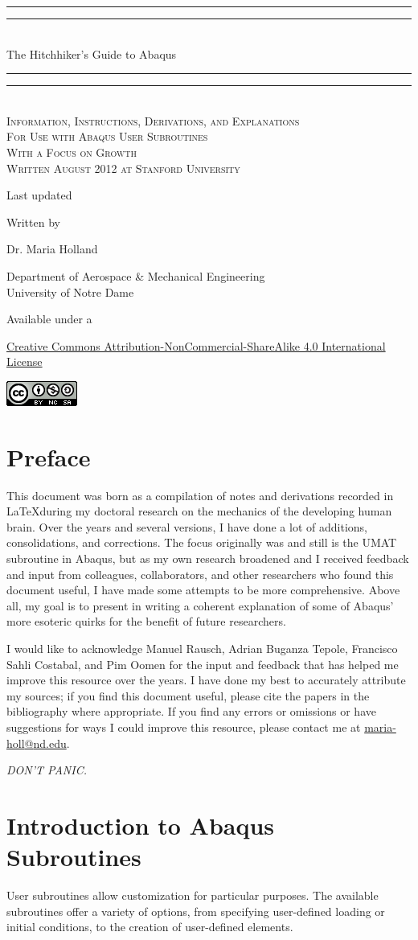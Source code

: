 \documentclass[10pt,letterpaper,oneside]{report}
\newcommand*{\titleGP}{\begingroup 
\thispagestyle{empty}
\centering

\vspace*{8\baselineskip} %
\rule{\textwidth}{1.6pt}\vspace*{-\baselineskip}\vspace*{2pt} 
\rule{\textwidth}{0.4pt}\\[\baselineskip] 
{\LARGE The Hitchhiker's Guide to Abaqus}\\[0.2\baselineskip] 
\rule{\textwidth}{0.4pt}\vspace*{-\baselineskip}\vspace{3.2pt} 
\rule{\textwidth}{1.6pt}\\[\baselineskip] %

\scshape
Information, Instructions, Derivations, and Explanations \\ 
For Use with Abaqus User Subroutines \\ 
With a Focus on Growth \\ [\baselineskip]
Written August 2012 at Stanford University \par  
Last updated \monthname \, \the\year

\vspace*{2\baselineskip} %

Written by \\[\baselineskip]
{\Large Dr. Maria Holland\par}
Department of Aerospace \& Mechanical Engineering \\ 
University of Notre Dame\par
\vspace*{2\baselineskip}
Available under a\par
\href{http://creativecommons.org/licenses/by-nc-sa/4.0/}{
Creative Commons Attribution-NonCommercial-ShareAlike 4.0 International License}

\includegraphics{CC_license.png}

\vfill

\endgroup}
\begin{document}
\titleGP 


\chapter*{Preface}
\thispagestyle{empty}

This document was born as a compilation of notes and derivations recorded in \LaTeX during my doctoral research on the mechanics of the developing human brain.  Over the years and several versions, I have done a lot of additions, consolidations, and corrections.  The focus originally was and still is the UMAT subroutine in Abaqus, but as my own research broadened and I received feedback and input from colleagues, collaborators, and other researchers who found this document useful, I have made some attempts to be more comprehensive.  Above all, my goal is to present in writing a coherent explanation of some of Abaqus' more esoteric quirks for the benefit of future researchers.

I would like to acknowledge Manuel Rausch, Adrian Buganza Tepole, Francisco Sahli Costabal, and Pim Oomen for the input and feedback that has helped me improve this resource over the years.  I have done my best to accurately attribute my sources; if you find this document useful, please cite the papers in the bibliography where appropriate.  If you find any errors or omissions or have suggestions for ways I could improve this resource, please contact me at \href{mailto:maria-holl@nd.edu}{maria-holl{\selectfont @}nd.edu}.

\vspace{0.5in}
\begin{center} 
\large{\emph{DON'T PANIC.}}
\end{center}

\restoregeometry
\setcounter{tocdepth}{1}
\tableofcontents



\chapter{Introduction to Abaqus Subroutines}

User subroutines allow customization for particular purposes.  The available subroutines offer a variety of options, from specifying user-defined loading or initial conditions, to the creation of user-defined elements.  
\end{document}
